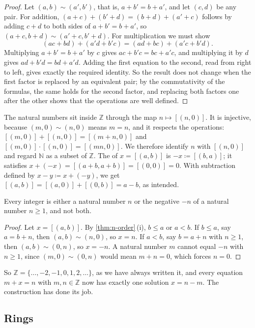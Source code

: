 \begin{proof}
Let $(a,b)\sim(a',b')$, that is, $a+b'=b+a'$, and let $(c,d)$ be any pair. For addition, $(a+c)+(b'+d)=(b+d)+(a'+c)$ follows by adding $c+d$ to both sides of $a+b'=b+a'$, so $(a+c,b+d)\sim(a'+c,b'+d)$. For multiplication we must show
\[
(ac+bd)+(a'd+b'c)=(ad+bc)+(a'c+b'd).
\]
Multiplying $a+b'=b+a'$ by $c$ gives $ac+b'c=bc+a'c$, and multiplying it by $d$ gives $ad+b'd=bd+a'd$. Adding the first equation to the second, read from right to left, gives exactly the required identity. So the result does not change when the first factor is replaced by an equivalent pair; by the commutativity of the formulas, the same holds for the second factor, and replacing both factors one after the other shows that the operations are well defined.
\end{proof}

The natural numbers sit inside $\mathbb Z$ through the map $n\mapsto[(n,0)]$. It is injective, because $(m,0)\sim(n,0)$ means $m=n$, and it respects the operations: $[(m,0)]+[(n,0)]=[(m+n,0)]$ and $[(m,0)]\cdot[(n,0)]=[(mn,0)]$. We therefore identify $n$ with $[(n,0)]$ and regard $\mathbb N$ as a subset of $\mathbb Z$. The  of $x=[(a,b)]$ is $-x\coloneqq[(b,a)]$; it satisfies $x+(-x)=[(a+b,a+b)]=[(0,0)]=0$. With subtraction defined by $x-y\coloneqq x+(-y)$, we get $[(a,b)]=[(a,0)]+[(0,b)]=a-b$, as intended.

\begin{proposition}
\label{prop:z-sign}
Every integer is either a natural number $n$ or the negative $-n$ of a natural number $n\ge1$, and not both.
\end{proposition}

\begin{proof}
Let $x=[(a,b)]$. By \cref{thm:n-order}\,(i), $b\le a$ or $a<b$. If $b\le a$, say $a=b+n$, then $(a,b)\sim(n,0)$, so $x=n$. If $a<b$, say $b=a+n$ with $n\ge1$, then $(a,b)\sim(0,n)$, so $x=-n$. A natural number $m$ cannot equal $-n$ with $n\ge1$, since $(m,0)\sim(0,n)$ would mean $m+n=0$, which forces $n=0$.
\end{proof}

So $\mathbb Z=\{\ldots,-2,-1,0,1,2,\ldots\}$, as we have always written it, and every equation $m+x=n$ with $m,n\in\mathbb Z$ now has exactly one solution $x=n-m$. The construction has done its job.

\subsection{Rings}

